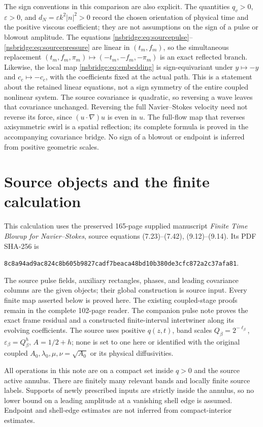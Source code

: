 The sign conventions in this comparison are also explicit.  The quantities
$q_v>0$, $\varepsilon>0$, and $d_N=\varepsilon k^2|n|^2>0$ record the chosen
orientation of physical time and the positive viscous coefficient; they are
not assumptions on the sign of a pulse or blowout amplitude.  The equations
\eqref{nsbridge:eq:sourcepulse}--\eqref{nsbridge:eq:sourcepressure} are linear in $(t_m,f_m)$,
so the simultaneous replacement $(t_m,f_m,\pi_m)\mapsto
(-t_m,-f_m,-\pi_m)$ is an exact reflected branch.  Likewise, the local map
\eqref{nsbridge:eq:embedding} is sign-equivariant under $y\mapsto-y$ and
$c_c\mapsto-c_c$, with the coefficients fixed at the actual path.
This is a statement about the retained linear equations, not a sign symmetry
of the entire coupled nonlinear system.
The source covariance is quadratic, so reversing a wave leaves that
covariance unchanged. Reversing the full Navier--Stokes velocity need not
reverse its force, since $(u\cdot\nabla)u$ is even in $u$.
The full-flow map that reverses axisymmetric swirl is a spatial reflection;
its complete formula is proved in the accompanying covariance bridge.
No sign of a blowout or endpoint is inferred from positive geometric scales.


\section{Source objects and the finite calculation}
This calculation uses the preserved 165-page supplied manuscript
\emph{Finite Time Blowup for Navier--Stokes}, source equations
(7.23)--(7.42), (9.12)--(9.14). Its PDF SHA-256 is
\begin{center}\small
\texttt{8c8a94ad9ac824c8b605b9827cadf7beaca48bd10b380de3cfc872a2c37afa81}.
\end{center}
The source pulse fields, auxiliary rectangles, phases, and leading
covariance columns are the given objects; their global construction is
source input. Every finite map asserted below is proved here. The existing
coupled-stage proofs remain in the complete 102-page reader. The companion
pulse note proves the exact frame residual and a constructed finite-interval
intertwiner along its evolving coefficients. The source uses positive
$q(z,t)$, band scales $Q_\beta=2^{-\ell_\beta}$,
$\varepsilon_\beta=Q_\beta^h$, $A=1/2+h$; none is set to one here or
identified with the original coupled $A_0,\lambda_0,\mu,\nu=\sqrt{A_0}$
or its physical diffusivities.

All operations in this note are on a compact set inside $q>0$ and the
source active annulus. There are finitely many relevant bands and
locally finite source labels. Supports of newly prescribed inputs are
strictly inside the annulus, so no lower bound on a leading amplitude
at a vanishing shell edge is assumed. Endpoint and shell-edge estimates
are not inferred from compact-interior estimates.

